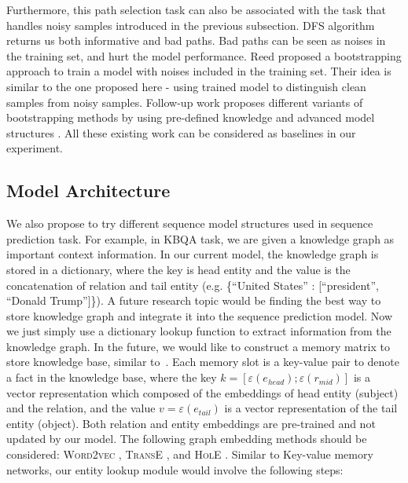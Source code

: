 Furthermore, this path selection task can also be associated with the task that handles noisy samples introduced in the previous subsection. DFS algorithm returns us both informative and bad paths. Bad paths can be seen as noises in the training set, and hurt the model performance. Reed \cite{reed2014training2} proposed a bootstrapping approach to train a model with noises included in the training set. Their idea is similar to the one proposed here - using trained model to distinguish clean samples from noisy samples. Follow-up work proposes different variants of bootstrapping methods by using pre-defined knowledge and advanced model structures \cite{tanaka2018joint,yi2019probabilistic,han2019deep}. All these existing work can be considered as baselines in our experiment.


\subsection{Model Architecture} \label{future_model}

We also propose to try different sequence model structures used in sequence prediction task. For example, in KBQA task, we are given a knowledge graph as important context information. In our current model, the knowledge graph is stored in a dictionary, where the key is head entity and the value is the concatenation of relation and tail entity (e.g. \{``United States'' : [``president'', ``Donald Trump'']\}). A future research topic would be finding the best way to store knowledge graph and integrate it into the sequence prediction model. Now we just simply use a dictionary lookup function to extract information from the knowledge graph. In the future, we would like to construct a memory matrix to store knowledge base, similar to~\cite{DBLP:conf/emnlp/MillerFDKBW16}. Each memory slot is a key-value pair to denote a fact in the knowledge base, where the key $k=[\varepsilon(e_{head});\varepsilon(r_{mid})]$ is a vector representation which composed of the embeddings of head entity (subject) and the relation, and the value $v=\varepsilon(e_{tail})$ is a vector representation of the tail entity (object). Both relation and entity embeddings are pre-trained and not updated by our model. The following graph embedding methods should be considered: \textsc{Word2vec} \cite{DBLP:journals/corr/abs-1301-3781}, \textsc{TransE} \cite{DBLP:conf/nips/BordesUGWY13}, and \textsc{HolE} \cite{DBLP:journals/corr/TrouillonN17}. Similar to Key-value memory networks, our entity lookup module would involve the following steps: 

